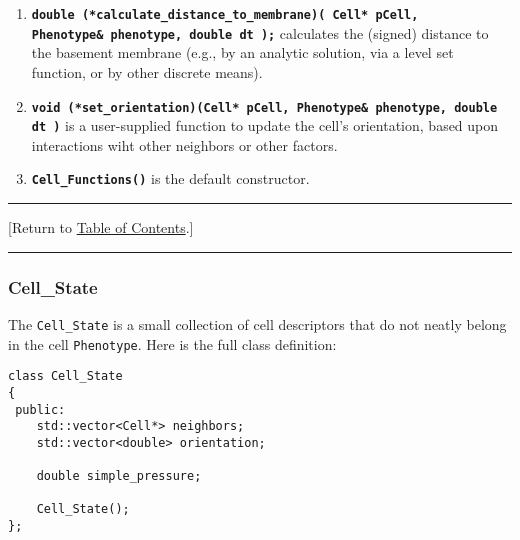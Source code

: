 \documentclass[12pt]{article}
\renewcommand{\v}{\verb}
\newcommand{\smallcode}[1]{\textbf{\texttt{#1}}}
\newcommand{\TOClink}{\begin{center}\hrule\vskip-10pt\phantom{.}\hfill[Return to \hyperlink{TOC}{Table of Contents}.]\hfill\phantom{.}\vskip3pt\hrule\end{center}}
\begin{document}
\begin{enumerate}
\item
\smallcode{double (*calculate\_distance\_to\_membrane)( Cell* pCell, \\
\phantom{double }Phenotype\& phenotype, double dt );} calculates the 
(signed) distance to the basement membrane (e.g., by an analytic solution, 
via a level set function, or by other discrete means). 

\item
\smallcode{void (*set\_orientation)(Cell* pCell, Phenotype\& phenotype, double dt )} 
is a user-supplied function to update the cell's orientation, based upon interactions 
wiht other neighbors or other factors. 

\item 
\smallcode{Cell\_Functions()} is the default constructor. 

\end{enumerate}

\TOClink 

\subsubsection{Cell\_State}
\label{sec:Cell_State}
The \v|Cell_State| is a small collection of cell 
descriptors that do not neatly belong in the cell \v|Phenotype|. 
Here is the full class definition: 
\begin{verbatim}
class Cell_State
{
 public:
    std::vector<Cell*> neighbors;   
    std::vector<double> orientation;
    
    double simple_pressure; 
    
    Cell_State(); 
};
\end{verbatim}
\end{document}
